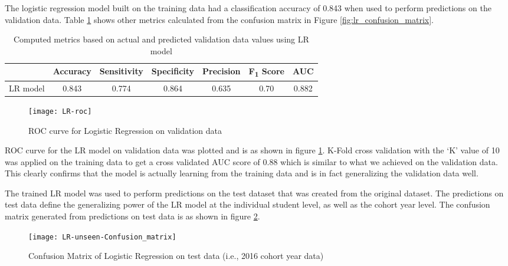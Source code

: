 \documentclass[11pt,openright]{report}
\begin{document}
The logistic regression model built on the training data had a classification accuracy of 0.843 when used to perform predictions on the validation data. Table \ref{table:lr-metrics_db} shows other metrics calculated from the confusion matrix in Figure \ref{fig:lr_confusion_matrix}. 

\begin{table} [!htb]
	\renewcommand{\arraystretch}{1.3}
	\caption{Computed metrics based on actual and predicted validation data values using LR model}
	\label{table:lr-metrics_db}
	\centering
	\begin{tabular}{|c|c|c|c|c|c|c|}
    \hline
  	 & \bfseries Accuracy & \bfseries Sensitivity & \bfseries Specificity & \bfseries Precision & \bfseries F\textsubscript{1} Score  & \bfseries AUC\\  
    \hline
	LR model & 0.843 & 0.774 & 0.864 & 0.635 & 0.70 & 0.882 \\ \hline
	\end{tabular} 
\end{table}


 \begin{figure}[!htb]
	\centering
	\texttt{[image: LR-roc]}
	\caption{ROC curve for Logistic Regression on validation data}
	\label{fig:lr_roc}
\end{figure} 

ROC curve for the LR model on validation data was plotted and is as shown in figure \ref{fig:lr_roc}. K-Fold cross validation with the `K' value of 10 was applied on the training data to get a cross validated AUC score of 0.88 which is similar to what we achieved on the validation data. This clearly confirms that the model is actually learning from the training data and is in fact generalizing the validation data well.

The trained LR model was used to perform predictions on the test dataset that was created from the original dataset. The predictions on test data define the generalizing power of the LR model at the individual student level, as well as the cohort year level. The confusion matrix generated from predictions on test data is as shown in figure \ref{fig:lr_unseen_confusion_matrix}.

  \begin{figure}[!htb]
	\centering
	\texttt{[image: LR-unseen-Confusion\_matrix]}
	\caption{Confusion Matrix of Logistic Regression on test data (i.e., 2016 cohort year data)}
	\label{fig:lr_unseen_confusion_matrix}
\end{figure} 
\end{document}
